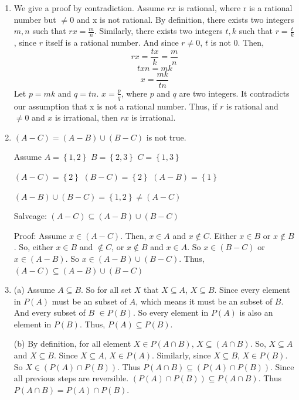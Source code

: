 \documentclass[a4paper]{article}
\begin{document}
\begin{enumerate}
\item[13]
We give a proof by contradiction. 
Assume $rx$ is rational, where r is a rational number but $\neq 0$ and x is not rational. By definition, there exists two integers $m,n$ such that $rx=\frac{m}{n}$. Similarly, there exists two integers $t,k$ such that $r=\frac{t}{k}$, since $r$ itself is a rational number. And since $r \neq 0$, $t$ is not $0$. 
Then,
 $$rx=\frac{tx}{k}=\frac{m}{n}$$
 $$txn=mk$$
 $$x=\frac{mk}{tn}$$
Let $p=mk$ and $q=tn$. $x=\frac{p}{q}$, where $p$ and $q$ are two integers. It contradicts our assumption that x is not a rational number. Thus, if $r$ is rational and $\neq 0$ and $x$ is irrational, then $rx$ is irrational. 





\item[4e]
$(A-C)=(A-B)\cup(B-C)$ is not true. 


Assume $A=\left\{{1,2}\right\}$ $B=\left\{{2,3}\right\}$ $C=\left\{{1,3}\right\}$


$(A-C)=\left\{{2}\right\}$ $(B-C)=\left\{{2}\right\}$ $(A-B)=\left\{{1}\right\}$ 

$(A-B)\cup(B-C)=\left\{{1,2}\right\} \neq (A-C)$


Salveage: $(A-C) \subseteq (A-B)\cup(B-C)$


Proof: Assume $x \in (A-C)$. Then, $x \in A$ and $x \notin C$. Either $x \in B$ or $x \notin B$. So, either $x \in B$ and $\notin C$, or $x \notin B$ and $x \in A$. So $x \in (B-C)$ or $x \in (A-B)$. So $x \in (A-B)\cup(B-C)$. Thus, $(A-C) \subseteq (A-B)\cup(B-C)$









\item[8]
(a) Assume $A \subseteq B$. So for all set $X$ that $X \subseteq A$, $X \subseteq B$. Since every element in $P(A)$ must be an subset of $A$, which means it must be an subset of $B$. And every subset of $B$ $\in P(B)$. So every element in $P(A)$ is also an element in $P(B)$. Thus, $P(A) \subseteq P(B)$.  


(b) By definition, for all element $X \in P(A \cap B)$, $X \subseteq (A \cap B)$. So, $X \subseteq A$ and $X \subseteq B$. Since $X \subseteq A$, $X \in P(A)$. Similarly, since $X \subseteq B$, $X \in P(B)$. So $X \in (P(A) \cap P(B)) $. Thus $P(A \cap B) \subseteq (P(A) \cap P(B))$. Since all previous steps are reversible. $(P(A) \cap P(B)) \subseteq P(A \cap B)$. Thus $P(A \cap B) = P(A) \cap P(B)$.



\end{enumerate}
\end{document}
